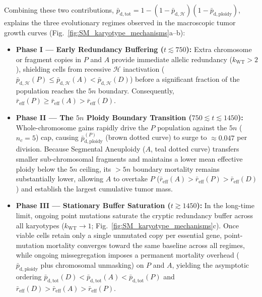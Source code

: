 \documentclass[11pt,a4paper]{article}
\begin{document}
Combining these two contributions, $\bar{p}_{\mathrm{d},\mathrm{tot}} = 1 - (1 - \bar{p}_{\mathrm{d},\mathcal{H}})(1 - \bar{p}_{\mathrm{d},\mathrm{ploidy}})$, explains the three evolutionary regimes observed in the macroscopic tumor growth curves (Fig.~\ref{fig:SM_karyotype_mechanisms}a--b):
\begin{itemize}
    \item \textbf{Phase I --- Early Redundancy Buffering ($t \lesssim 750$):} Extra chromosome or fragment copies in $P$ and $A$ provide immediate allelic redundancy ($k_{\mathrm{WT}} > 2$), shielding cells from recessive $\mathcal{H}$ inactivation ($\bar{p}_{\mathrm{d},\mathcal{H}}(P) \le \bar{p}_{\mathrm{d},\mathcal{H}}(A) < \bar{p}_{\mathrm{d},\mathcal{H}}(D)$) before a significant fraction of the population reaches the $5n$ boundary. Consequently, $\bar{r}_{\mathrm{eff}}(P) \ge \bar{r}_{\mathrm{eff}}(A) > \bar{r}_{\mathrm{eff}}(D)$.
    \item \textbf{Phase II --- The $5n$ Ploidy Boundary Transition ($750 \lesssim t \lesssim 1450$):} Whole-chromosome gains rapidly drive the $P$ population against the $5n$ ($n_c = 5$) cap, causing $\bar{p}_{\mathrm{d},\mathrm{ploidy}}^{(P)}$ (brown dotted curve) to surge to $\approx 0.047$ per division. Because Segmental Aneuploidy ($A$, teal dotted curve) transfers smaller sub-chromosomal fragments and maintains a lower mean effective ploidy below the $5n$ ceiling, its $>5n$ boundary mortality remains substantially lower, allowing $A$ to overtake $P$ ($\bar{r}_{\mathrm{eff}}(A) > \bar{r}_{\mathrm{eff}}(P) > \bar{r}_{\mathrm{eff}}(D)$) and establish the largest cumulative tumor mass.
    \item \textbf{Phase III --- Stationary Buffer Saturation ($t \gtrsim 1450$):} In the long-time limit, ongoing point mutations saturate the cryptic redundancy buffer across all karyotypes ($k_{\mathrm{WT}} \to 1$; Fig.~\ref{fig:SM_karyotype_mechanisms}c). Once viable cells retain only a single unmutated copy per essential gene, point-mutation mortality converges toward the same baseline across all regimes, while ongoing missegregation imposes a permanent mortality overhead ($\bar{p}_{\mathrm{d},\mathrm{ploidy}}$ plus chromosomal unmasking) on $P$ and $A$, yielding the asymptotic ordering $\bar{p}_{\mathrm{d},\mathrm{tot}}(D) < \bar{p}_{\mathrm{d},\mathrm{tot}}(A) < \bar{p}_{\mathrm{d},\mathrm{tot}}(P)$ and $\bar{r}_{\mathrm{eff}}(D) > \bar{r}_{\mathrm{eff}}(A) > \bar{r}_{\mathrm{eff}}(P)$.
\end{itemize}
\end{document}
